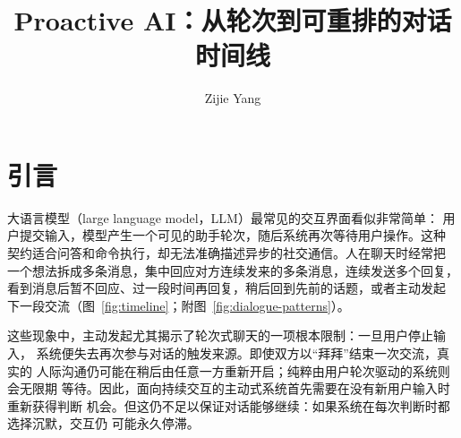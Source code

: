 \documentclass[manuscript,nonacm]{acmart}
\title{Proactive AI：从轮次到可重排的对话时间线}
\author{Zijie Yang}
\affiliation{%
  \institution{Airalogy}
  \city{Hangzhou}
  \country{China}
}
\begin{document}
\renewcommand{\figurename}{图}
\renewcommand{\tablename}{表}
\renewcommand{\refname}{参考文献}
\renewcommand{\keywordsname}{关键词}
\captionsetup[figure]{name=图}
\captionsetup[table]{name=表}
\maketitle

\section{引言}

大语言模型（large language model，LLM）最常见的交互界面看似非常简单：
用户提交输入，模型产生一个可见的助手轮次，随后系统再次等待用户操作。这种
契约适合问答和命令执行，却无法准确描述异步的社交通信。人在聊天时经常把
一个想法拆成多条消息，集中回应对方连续发来的多条消息，连续发送多个回复，
看到消息后暂不回应、过一段时间再回复，稍后回到先前的话题，或者主动发起
下一段交流（图~\ref{fig:timeline}；附图~\ref{fig:dialogue-patterns}）。

这些现象中，主动发起尤其揭示了轮次式聊天的一项根本限制：一旦用户停止输入，
系统便失去再次参与对话的触发来源。即使双方以“拜拜”结束一次交流，真实的
人际沟通仍可能在稍后由任意一方重新开启；纯粹由用户轮次驱动的系统则会无限期
等待。因此，面向持续交互的主动式系统首先需要在没有新用户输入时重新获得判断
机会。但这仍不足以保证对话能够继续：如果系统在每次判断时都选择沉默，交互仍
可能永久停滞。
\end{document}
